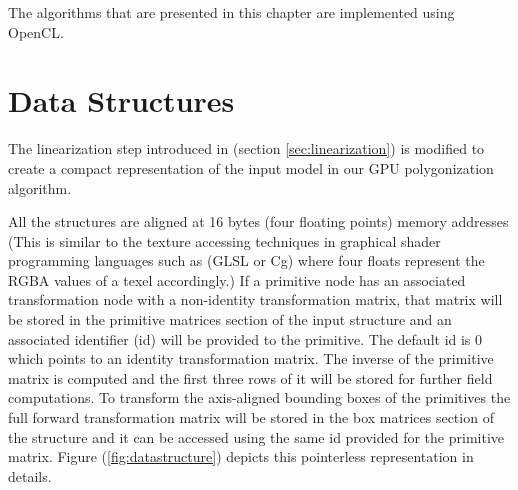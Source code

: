 The algorithms that are presented in this chapter are implemented using OpenCL. 




\section{Data Structures}
\label{sec:datastructure}
The \blob linearization step introduced in (section \ref{sec:linearization}) is modified to create a compact representation of the input model in our 
GPU polygonization algorithm. 

All the structures are aligned at 16 bytes (four floating points) memory addresses (This is similar to the texture 
accessing techniques in graphical shader programming languages such as (GLSL or Cg) where four floats represent the 
RGBA values of a texel accordingly.) If a primitive node has an associated transformation node with a non-identity 
transformation matrix, that matrix will be stored in the primitive matrices section of the input structure and an 
associated identifier (id) will be provided to the primitive. The default id is 0 which points to an identity transformation 
matrix. The inverse of the primitive matrix is computed and the first three rows of it will be stored for further field 
computations. To transform the axis-aligned bounding boxes of the primitives the full forward transformation matrix will 
be stored in the box matrices section of the structure and it can be accessed using the same id provided for the primitive matrix.
Figure (\ref{fig:datastructure}) depicts this pointerless representation in details.

